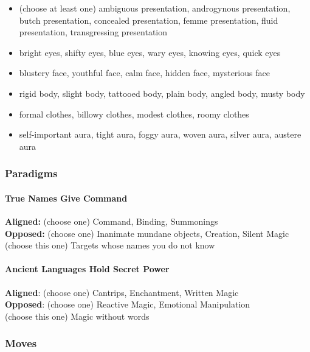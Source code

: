 \documentclass[
]{article}
\providecommand{\tightlist}{%
  \setlength{\itemsep}{0pt}\setlength{\parskip}{0pt}}
\begin{document}
\begin{itemize}
\tightlist
\item
  (choose at least one) ambiguous presentation, androgynous
  presentation, butch presentation, concealed presentation, femme
  presentation, fluid presentation, transgressing presentation
\item
  bright eyes, shifty eyes, blue eyes, wary eyes, knowing eyes, quick
  eyes
\item
  blustery face, youthful face, calm face, hidden face, mysterious face
\item
  rigid body, slight body, tattooed body, plain body, angled body, musty
  body
\item
  formal clothes, billowy clothes, modest clothes, roomy clothes
\item
  self-important aura, tight aura, foggy aura, woven aura, silver aura,
  austere aura
\end{itemize}

\hypertarget{paradigms}{%
\subsubsection{Paradigms}\label{paradigms}}

\hypertarget{true-names-give-command}{%
\paragraph{True Names Give Command}\label{true-names-give-command}}

\textbf{Aligned:} (choose one) Command, Binding, Summonings\\
\textbf{Opposed:} (choose one) Inanimate mundane objects, Creation,
Silent Magic\\
(choose this one) Targets whose names you do not know

\hypertarget{ancient-languages-hold-secret-power}{%
\paragraph{Ancient Languages Hold Secret
Power}\label{ancient-languages-hold-secret-power}}

\textbf{Aligned}: (choose one) Cantrips, Enchantment, Written Magic\\
\textbf{Opposed}: (choose one) Reactive Magic, Emotional Manipulation\\
(choose this one) Magic without words

\hypertarget{moves}{%
\subsubsection{Moves}\label{moves}}
\end{document}
